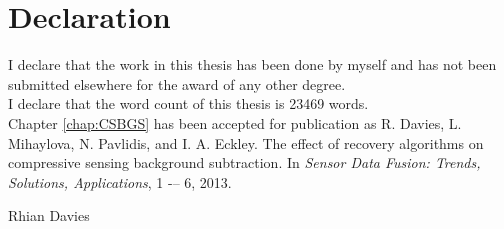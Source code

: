 \documentclass[12pt, a4]{report}
\begin{document}
\pagebreak
{}
\setcounter{page}{1}

\pagebreak

\pagebreak
 \chapter*{Declaration}

I declare that the work in this thesis has been done by myself and has not been submitted elsewhere for the award of any other degree. \\

\noindent I declare that the word  count of this thesis is 23469 words.\\

\noindent Chapter \ref{chap:CSBGS} has been accepted for publication as R. Davies, L. Mihaylova, N. Pavlidis, and I. A. Eckley. The effect of recovery algorithms on
compressive sensing background subtraction. In \textit{Sensor Data Fusion: Trends, Solutions, Applications}, 1 -– 6, 2013.

\begin{flushright}  
  Rhian Davies
 \end{flushright}

\pagebreak
\tableofcontents
{}

\let\oldchapter\chapter
\renewcommand{\chapter}[1]{
	\setcounter{figure}{0}
	\setcounter{table}{0}
	\setcounter{equation}{0}
	\oldchapter{#1}
}
\pagebreak
{}
\setcounter{page}{1}

\end{document}
